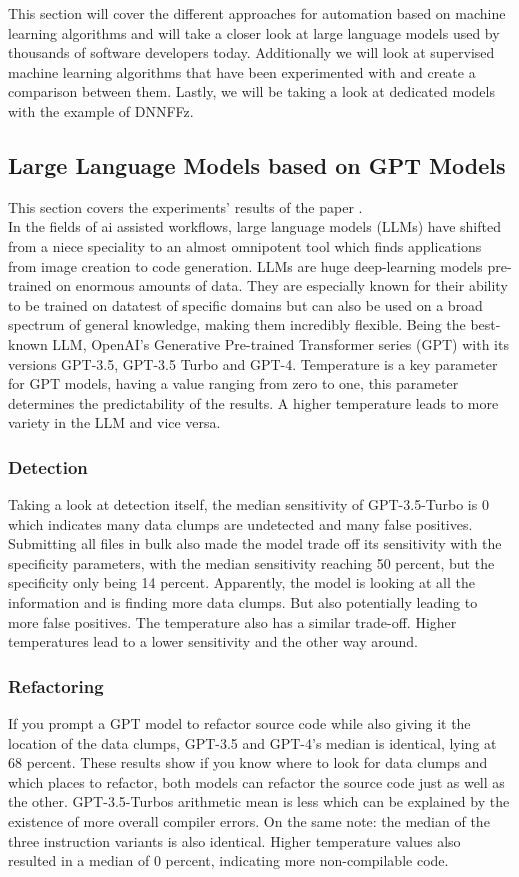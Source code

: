 This section will cover the different approaches for automation based on machine learning algorithms and will take a closer look at large language models used by thousands of software developers today. Additionally we will look at supervised machine learning algorithms that have been experimented with and create a comparison between them. Lastly, we will be taking a look at dedicated models with the example of DNNFFz.
\subsection{Large Language Models based on GPT Models}
This section covers the experiments' results of the paper \cite[AI-Driven Refactoring: A Pipeline for Identifying and Correcting Data Clumps in Git Repositories]{baumgartner2024aidriven}.\\
In the fields of ai assisted workflows, large language models (LLMs) have shifted from a niece speciality to an almost omnipotent tool which finds applications from image creation to code generation.\cite{meyer2024ai} LLMs are huge deep-learning models pre-trained on enormous amounts of data. They are especially known for their ability to be trained on datatest of specific domains but can also be used on a broad spectrum of general knowledge, making them incredibly flexible. \cite{baumgartner2024aidriven}
Being the best-known LLM, OpenAI's Generative Pre-trained Transformer series (GPT) with its versions GPT-3.5, GPT-3.5 Turbo and GPT-4.
Temperature is a key parameter for GPT models, having a value ranging from zero to one, this parameter determines the predictability of the results. 
A higher temperature leads to more variety in the LLM and vice versa.
\subsubsection{Detection}
Taking a look at detection itself, the median sensitivity of GPT-3.5-Turbo is 0 which indicates many data clumps are undetected and many false positives.
Submitting all files in bulk also made the model trade off its sensitivity with the specificity parameters, with the median sensitivity reaching 50 percent, but the specificity only being 14 percent. 
Apparently, the model is looking at all the information and is finding more data clumps. But also potentially leading to more false positives.
The temperature also has a similar trade-off. Higher temperatures lead to a lower sensitivity and the other way around.
\subsubsection{Refactoring}
If you prompt a GPT model to refactor source code while also giving it the location of the data clumps, GPT-3.5 and GPT-4's median is identical, lying at 68 percent.
These results show if you know where to look for data clumps and which places to refactor, both models can refactor the source code just as well as the other.
GPT-3.5-Turbos arithmetic mean is less which can be explained by the existence of more overall compiler errors.
On the same note: the median of the three instruction variants is also identical.
Higher temperature values also resulted in a median of 0 percent, indicating more non-compilable code.

